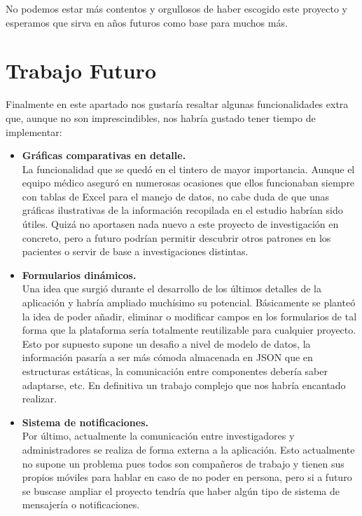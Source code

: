     No podemos estar más contentos y orgullosos de haber escogido este proyecto y esperamos que sirva en años futuros como base para muchos más. \newpage
    
     \section{Trabajo Futuro}
     
      Finalmente en este apartado nos gustaría resaltar algunas funcionalidades extra que, aunque no son imprescindibles, nos habría gustado tener tiempo de implementar:
 \newline
 
 \begin{itemize}
  \item\textbf{Gráficas comparativas en detalle.} \\
  La funcionalidad que se quedó en el tintero de mayor importancia. Aunque el equipo médico aseguró en numerosas ocasiones que ellos funcionaban siempre con tablas de Excel para el manejo de datos, no cabe duda de que unas gráficas ilustrativas de la información recopilada en el estudio habrían sido útiles. Quizá no aportasen nada nuevo a este proyecto de investigación en concreto, pero a futuro podrían permitir descubrir otros patrones en los pacientes o servir de base a investigaciones distintas. \\
  
  \item\textbf{Formularios dinámicos.} \\
  Una idea que surgió durante el desarrollo de los últimos detalles de la aplicación y habría ampliado muchísimo su potencial. Básicamente se planteó la idea de poder añadir, eliminar o modificar campos en los formularios de tal forma que la plataforma sería totalmente reutilizable para cualquier proyecto. Esto por supuesto supone un desafio a nivel de modelo de datos, la información pasaría a ser más cómoda almacenada en JSON que en estructuras estáticas, la comunicación entre componentes debería saber adaptarse, etc. En definitiva un trabajo complejo que nos habría encantado realizar. \\
  
  \item\textbf{Sistema de notificaciones.} \\
  Por último, actualmente la comunicación entre investigadores y administradores se realiza de forma externa a la aplicación. Esto actualmente no supone un problema pues todos son compañeros de trabajo y tienen sus propios móviles para hablar en caso de no poder en persona, pero si a futuro se buscase ampliar el proyecto tendría que haber algún tipo de sistema de mensajería o notificaciones. 
  \newline
  

\end{itemize}
